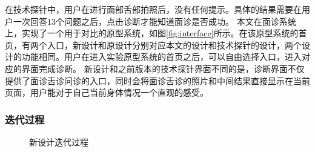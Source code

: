 在技术探针中，用户在进行面部舌部拍照后，没有任何提示。具体的结果需要在用户一次回答13个问题之后，点击诊断才能知道面诊是否成功。
本文在面诊系统上，实现了一个用于对比的原型系统，如图\ref{fig:interface}所示。在该原型系统的首页，有两个入口，新设计和原设计分别对应本文的设计和技术探针的设计，两个设计的功能相同。用户在进入实验原型系统的首页之后，可以自由选择入口，进入对应的界面完成诊断。
新设计和之前版本的技术探针界面不同的是，诊断界面不仅提供了面诊舌诊问诊的入口，同时会将面诊舌诊的照片和中间结果直接显示在当前页面，用户能对于自己当前身体情况一个直观的感受。

\subsubsection{迭代过程}
\begin{figure}[h]
    \centering
    \caption{新设计迭代过程}
    \label{fig:diag_new}
\end{figure}
